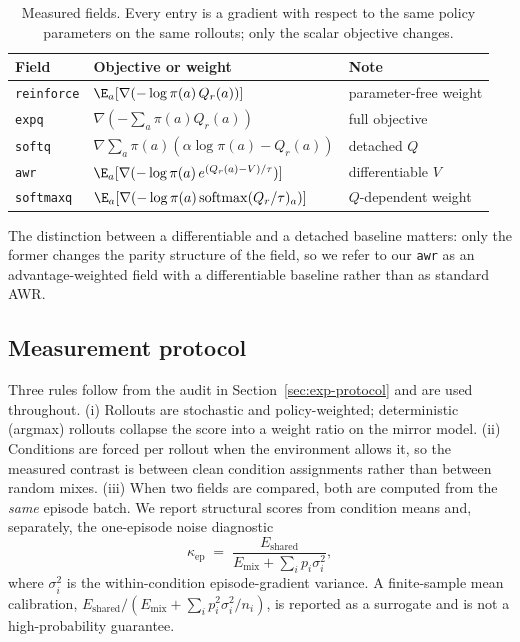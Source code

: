 \documentclass{article}
\newcommand{\kep}{\kappa_{\mathrm{ep}}}
\begin{document}
\begin{table}[t]
\caption{Measured fields. Every entry is a gradient with respect to the same
policy parameters on the same rollouts; only the scalar objective changes.}
\label{tab:fields}
\begin{center}
\begin{tabular}{lll}
\toprule
Field & Objective or weight & Note \\
\midrule
\texttt{reinforce} & $\E_a[\nabla(-\log\pi(a)\,Q_r(a))]$ & parameter-free weight \\
\texttt{expq} & $\nabla(-\sum_a \pi(a) Q_r(a))$ & full objective \\
\texttt{softq} & $\nabla\sum_a \pi(a)(\alpha\log\pi(a)-Q_r(a))$ & detached $Q$ \\
\texttt{awr} & $\E_a[\nabla(-\log\pi(a)\,e^{(Q_r(a)-V)/\tau})]$ & differentiable $V$ \\
\texttt{softmaxq} & $\E_a[\nabla(-\log\pi(a)\,\mathrm{softmax}(Q_r/\tau)_a)]$ & $Q$-dependent weight \\
\bottomrule
\end{tabular}
\end{center}
\end{table}

The distinction between a differentiable and a detached baseline matters:
only the former changes the parity structure of the field, so we refer to our
\texttt{awr} as an advantage-weighted field with a differentiable baseline
rather than as standard AWR.

\subsection{Measurement protocol}
\label{sec:setup-protocol}

Three rules follow from the audit in Section~\ref{sec:exp-protocol} and are
used throughout. (i) Rollouts are stochastic and policy-weighted;
deterministic (argmax) rollouts collapse the score into a weight ratio on the
mirror model. (ii) Conditions are forced per rollout when the environment
allows it, so the measured contrast is between clean condition assignments
rather than between random mixes. (iii) When two fields are compared, both are
computed from the \emph{same} episode batch. We report structural scores from
condition means and, separately, the one-episode noise diagnostic
\begin{equation}
\kep \;=\; \frac{E_{\mathrm{shared}}}{E_{\mathrm{mix}}+\sum_i p_i\sigma_i^2},
\end{equation}
where $\sigma_i^2$ is the within-condition episode-gradient variance. A
finite-sample mean calibration,
$E_{\mathrm{shared}}/(E_{\mathrm{mix}}+\sum_i p_i^2\sigma_i^2/n_i)$, is
reported as a surrogate and is not a high-probability guarantee.
\end{document}
